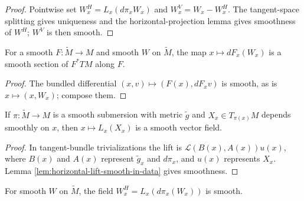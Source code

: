 \begin{proof}

\sketch Pointwise set $W_x^H=L_x(d\pi_xW_x)$ and $W_x^V=W_x-W_x^H$. The tangent-space splitting gives uniqueness and the horizontal-projection lemma gives smoothness of $W^H$; $W^V$ is then smooth.
\end{proof}

\begin{lemma}
\label{lem:pushforward-along-map-smooth}





For a smooth $F:\tilde M\to M$ and smooth $W$ on $\tilde M$, the map $x\mapsto dF_x(W_x)$ is a smooth section of $F^*TM$ along $F$.
\end{lemma}

\begin{proof}

\sketch The bundled differential $(x,v)\mapsto(F(x),dF_xv)$ is smooth, as is $x\mapsto(x,W_x)$; compose them.
\end{proof}

\begin{lemma}
\label{lem:horizontal-lift-along-smooth}





If $\pi:\tilde M\to M$ is a smooth submersion with metric $\tilde g$ and $X_x\in T_{\pi(x)}M$ depends smoothly on $x$, then $x\mapsto L_x(X_x)$ is a smooth vector field.
\end{lemma}

\begin{proof}

\sketch In tangent-bundle trivializations the lift is $\mathcal L(B(x),A(x))u(x)$, where $B(x)$ and $A(x)$ represent $\tilde g_x$ and $d\pi_x$, and $u(x)$ represents $X_x$. Lemma \ref{lem:horizontal-lift-smooth-in-data} gives smoothness.
\end{proof}

\begin{lemma}
\label{lem:horizontal-projection-field-smooth}





For smooth $W$ on $\tilde M$, the field $W_x^H=L_x(d\pi_x(W_x))$ is smooth.
\end{lemma}

